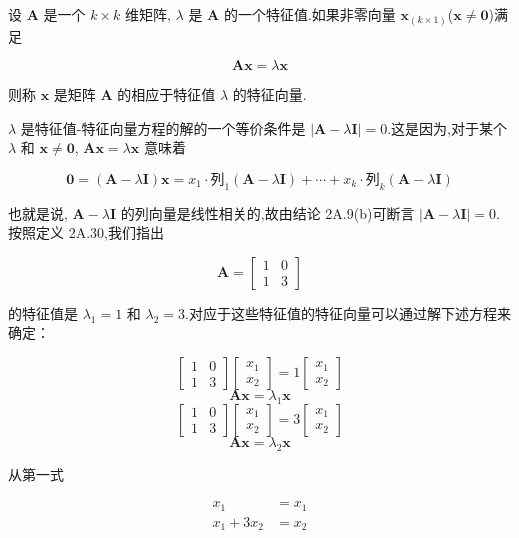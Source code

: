 
\quad 设 $\bm{A}$ 是一个 $k \times k$ 维矩阵, $\lambda$ 是 $\bm{A}$ 的一个特征值.如果非零向量 $\bm{x}_{(k \times 1)}$($\bm{x} \neq \bm{0}$)满足

\[
\bm{A}\bm{x} = \lambda\bm{x}
\]

则称 $\bm{x}$ 是矩阵 $\bm{A}$ 的相应于特征值 $\lambda$ 的特征向量.

$\lambda$ 是特征值-特征向量方程的解的一个等价条件是 $|\bm{A} - \lambda\bm{I}| = 0$.这是因为,对于某个 $\lambda$ 和 $\bm{x} \neq \bm{0}$, $\bm{A}\bm{x} = \lambda\bm{x}$ 意味着

\[
\bm{0} = (\bm{A} - \lambda\bm{I})\bm{x} = x_1 \cdot \text{列}_1(\bm{A} - \lambda\bm{I}) + \cdots + x_k \cdot \text{列}_k(\bm{A} - \lambda\bm{I})
\]

也就是说, $\bm{A} - \lambda\bm{I}$ 的列向量是线性相关的,故由结论 2A.9(b)可断言 $|\bm{A} - \lambda\bm{I}| = 0$.按照定义 2A.30,我们指出

\[
\bm{A} = \begin{bmatrix} 1 & 0 \\ 1 & 3 \end{bmatrix}
\]

的特征值是 $\lambda_1 = 1$ 和 $\lambda_2 = 3$.对应于这些特征值的特征向量可以通过解下述方程来确定：

\[
\begin{bmatrix} 1 & 0 \\ 1 & 3 \end{bmatrix}\begin{bmatrix} x_1 \\ x_2 \end{bmatrix} = 1\begin{bmatrix} x_1 \\ x_2 \end{bmatrix}
\]
\[
\bm{A}\bm{x} = \lambda_1\bm{x}
\]
\[
\begin{bmatrix} 1 & 0 \\ 1 & 3 \end{bmatrix}\begin{bmatrix} x_1 \\ x_2 \end{bmatrix} = 3\begin{bmatrix} x_1 \\ x_2 \end{bmatrix}
\]
\[
\bm{A}\bm{x} = \lambda_2\bm{x}
\]

从第一式

\[
\begin{aligned}
x_1 &= x_1 \\
x_1 + 3x_2 &= x_2
\end{aligned}
\]


